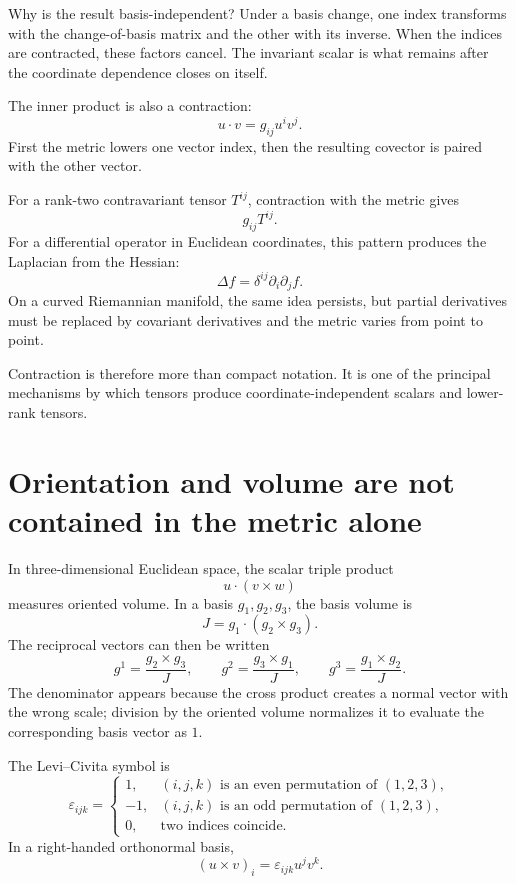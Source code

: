 Why is the result basis-independent?  Under a basis change, one index transforms with the change-of-basis matrix and the other with its inverse.  When the indices are contracted, these factors cancel.  The invariant scalar is what remains after the coordinate dependence closes on itself.

The inner product is also a contraction:
\[
  u\cdot v=g_{ij}u^iv^j.
\]
First the metric lowers one vector index, then the resulting covector is paired with the other vector.

For a rank-two contravariant tensor \(T^{ij}\), contraction with the metric gives
\[
  g_{ij}T^{ij}.
\]
For a differential operator in Euclidean coordinates, this pattern produces the Laplacian from the Hessian:
\[
  \Delta f=\delta^{ij}\partial_i\partial_j f.
\]
On a curved Riemannian manifold, the same idea persists, but partial derivatives must be replaced by covariant derivatives and the metric varies from point to point.

Contraction is therefore more than compact notation.  It is one of the principal mechanisms by which tensors produce coordinate-independent scalars and lower-rank tensors.

\section{Orientation and volume are not contained in the metric alone}

In three-dimensional Euclidean space, the scalar triple product
\[
  u\cdot(v\times w)
\]
measures oriented volume.  In a basis \(g_1,g_2,g_3\), the basis volume is
\[
  J=g_1\cdot(g_2\times g_3).
\]
The reciprocal vectors can then be written
\[
  g^1=\frac{g_2\times g_3}{J},
  \qquad
  g^2=\frac{g_3\times g_1}{J},
  \qquad
  g^3=\frac{g_1\times g_2}{J}.
\]
The denominator appears because the cross product creates a normal vector with the wrong scale; division by the oriented volume normalizes it to evaluate the corresponding basis vector as \(1\).

The Levi--Civita symbol is
\[
  \varepsilon_{ijk}=
  \begin{cases}
    1,&(i,j,k)\text{ is an even permutation of }(1,2,3),\\
    -1,&(i,j,k)\text{ is an odd permutation of }(1,2,3),\\
    0,&\text{two indices coincide.}
  \end{cases}
\]
In a right-handed orthonormal basis,
\[
  (u\times v)_i
  =\varepsilon_{ijk}u^jv^k.
\]

